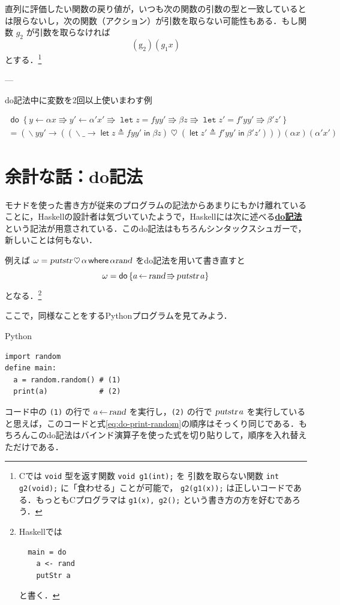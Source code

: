 \documentclass[a4paper,twocolumn]{jsbook}
\newcommand{\programminglanguage}[1]{\textsf{#1}}
\newcommand{\clang}{\programminglanguage{C}}
\newcommand{\haskell}{\programminglanguage{Haskell}}
\newcommand{\python}{\programminglanguage{Python}}
\newcommand{\keyword}[1]{{\underline{\textbf{#1}}}}
\newcommand{\code}[1]{\texttt{#1}}
\newenvironment{pythoncode}{\begin{itembox}[r]{\python}}{\end{itembox}}
\newcommand{\mKeyword}[1]{\mathsf{#1}} %
\newcommand{\mVarKeyword}[1]{\texttt{#1}}
\newcommand{\mDoKeyword}{\mKeyword{do}}
\newcommand{\mDoLetKeyword}{\mVarKeyword{let}}
\newcommand{\mInKeyword}{\mKeyword{in}}
\newcommand{\mLetKeyword}{\mKeyword{let}}
\newcommand{\mWhereKeyword}{\mKeyword{where}}
\DeclareMathOperator{\mDoKW}{\mDoKeyword}
\DeclareMathOperator{\mInKW}{\mInKeyword} %
\DeclareMathOperator{\mLet}{\mLetKeyword} %
\DeclareMathOperator{\mWhere}{\mWhereKeyword}
\newcommand{\mConst}[1]{\mathrm{#1}}
\newcommand{\mAnyParam}{\_}
\DeclareMathOperator{\mConst}{const}
\newcommand{\mAction}[1]{\textsl{#1}}
\DeclareMathOperator{\mPutStr}{\mAction{putstr}}
\DeclareMathOperator{\mRand}{\mAction{rand}}
\DeclareMathOperator{\mBind}{\heartsuit}
\DeclareMathOperator{\mDoEq}{\leftarrow}
\DeclareMathOperator{\mDoLetEq}{\mVarKeyword{=}}
\DeclareMathOperator{\mDoNext}{\Rrightarrow}%
\DeclareMathOperator{\mLambda}{\backslash}
\DeclareMathOperator{\mLambdaArrow}{\rightarrow}
\DeclareMathOperator{\mLetEq}{\triangleq}
\newcommand{\mDo}[1]{\mDoKW\left\{#1\right\}}
\newcommand{\mDoLet}[2]{\mathop{\mDoLetKeyword}#1\mDoLetEq#2}
\newcommand{\mLambdaExp}[2]{\mLambda{#1}\mLambdaArrow{#2}}
\newcommand{\mLetIn}[3]{\mLet{#1\mLetEq#2}\mInKW{#3}}
\newcommand{\mWhere}[2]{\mathbin{\mWhereKeyword}#1\mLetEq#2}
\begin{document}
直列に評価したい関数の戻り値が，いつも次の関数の引数の型と一致しているとは限らないし，次の関数（アクション）が引数を取らない可能性もある．もし関数 $g_2$ が引数を取らなければ
\begin{equation}
(\mConst g_2)(g_1x)
\end{equation}
とする．\footnote{\clang では \code{void} 型を返す関数 \code{void g1(int);} を 引数を取らない関数 \code{int g2(void);} に「食わせる」ことが可能で， \code{g2(g1(x));} は正しいコードである．もっとも\clang プログラマは \code{g1(x), g2();} という書き方の方を好むであろう．}

---


\begin{table}[tp]
\label{tab:do-alpha-alpha}
\caption{do記法中に変数を2回以上使いまわす例}
\begin{multline*}
\mDo{y\mDoEq\alpha x\mDoNext y'\mDoEq\alpha'x'\mDoNext\mDoLet{z}{fyy'}\mDoNext\beta z\mDoNext\mDoLet{z'}{f'yy'}\mDoNext\beta'z'}\\
=
(\mLambdaExp{yy'}{(
(\mLambdaExp{\mAnyParam}{\mLetIn{z}{fyy'}{\beta z}})
\mBind{}(\mLetIn{z'}{f'yy'}{\beta'z'}))})
(\alpha x)(\alpha'x')
\end{multline*}
\end{table}


\section{余計な話：do記法}

モナドを使った書き方が従来のプログラムの記法からあまりにもかけ離れていることに，\haskell の設計者は気づいていたようで，\haskell には次に述べる\keyword{do記法}という記法が用意されている．このdo記法はもちろんシンタックスシュガーで，新しいことは何もない．

例えば $\omega=\mPutStr\mBind\alpha\mWhere{\alpha}{\mRand}$ をdo記法を用いて書き直すと
\begin{equation}
\label{eq:do-print-random}
\omega=\mDo{a\mDoEq\mRand\mDoNext\mPutStr a}
\end{equation}
となる．\footnote{\haskell では
\begin{verbatim}
  main = do
    a <- rand
    putStr a
\end{verbatim}
と書く．}

ここで，同様なことをする\python プログラムを見てみよう．
\begin{pythoncode}
\begin{verbatim}
import random
define main:
  a = random.random() # (1)
  print(a)            # (2)
\end{verbatim}
\end{pythoncode}
コード中の \code{(1)} の行で $a\mDoEq\mRand$ を実行し，\code{(2)} の行で $\mPutStr a$ を実行していると思えば，このコードと式\eqref{eq:do-print-random}の順序はそっくり同じである．もちろんこのdo記法はバインド演算子を使った式を切り貼りして，順序を入れ替えただけである．
\end{document}
